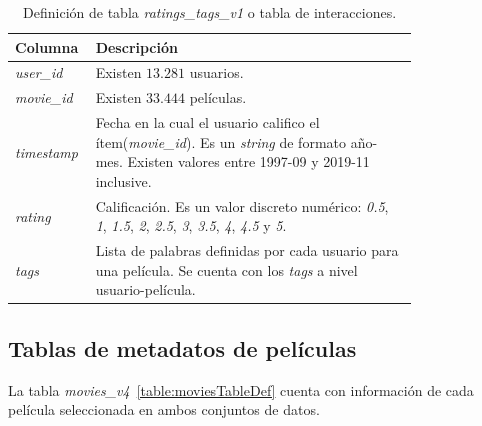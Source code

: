 \documentclass[11pt,a4paper,twoside]{thesis}
\begin{document}
\begin{table}[!htb]
	\centering
	\footnotesize
	\begin{tabular}{l | p{0.8\linewidth}}
		\hline
		Columna            & Descripción                                                                                                                                                                     \\
		\hline

		\textit{user\_id}  & Existen $13.281$ usuarios.                                                                                                                                                      \\
		\textit{movie\_id} & Existen $33.444$ películas.                                                                                                                                                     \\
		\textit{timestamp} & Fecha en la cual el usuario califico el ítem(\textit{movie\_id}). Es un \textit{string} de formato año-mes. Existen valores entre 1997-09 y 2019-11 inclusive.                  \\
		\textit{rating}    & Calificación. Es un valor discreto numérico: \textit{0.5}, \textit{1}, \textit{1.5}, \textit{2}, \textit{2.5}, \textit{3}, \textit{3.5}, \textit{4}, \textit{4.5} y \textit{5}. \\
		\textit{tags}      & Lista de palabras definidas por cada usuario para una película. Se cuenta con los \textit{tags} a nivel usuario-película.                                                       \\
		\hline
	\end{tabular}
	\caption{
		Definición de tabla \textit{ratings\_tags\_v1} o tabla de interacciones.
	}
	\label{table:interactionsTableDef}
\end{table}

\subsection{Tablas de metadatos de películas}

La tabla \textit{movies\_v4}~\ref{table:moviesTableDef} cuenta con información
de cada película seleccionada en ambos conjuntos de datos.
\end{document}
